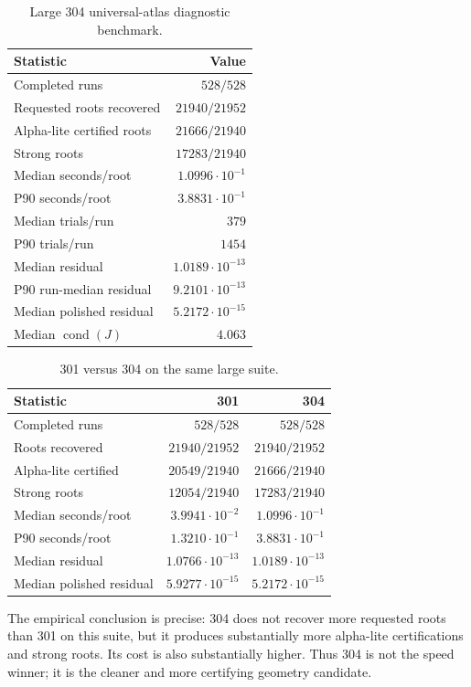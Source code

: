 \documentclass[11pt]{article}
\DeclareMathOperator{\cond}{cond}
\begin{document}
\begin{table}[h]
\centering
\caption{Large 304 universal-atlas diagnostic benchmark.}
\begin{tabular}{lr}
\toprule
Statistic & Value\\
\midrule
Completed runs & $528/528$\\
Requested roots recovered & $21940/21952$\\
Alpha-lite certified roots & $21666/21940$\\
Strong roots & $17283/21940$\\
Median seconds/root & $1.0996\cdot10^{-1}$\\
P90 seconds/root & $3.8831\cdot10^{-1}$\\
Median trials/run & $379$\\
P90 trials/run & $1454$\\
Median residual & $1.0189\cdot10^{-13}$\\
P90 run-median residual & $9.2101\cdot10^{-13}$\\
Median polished residual & $5.2172\cdot10^{-15}$\\
Median $\cond(J)$ & $4.063$\\
\bottomrule
\end{tabular}
\end{table}

\begin{table}[h]
\centering
\caption{301 versus 304 on the same large suite.}
\begin{tabular}{lrr}
\toprule
Statistic & 301 & 304\\
\midrule
Completed runs & $528/528$ & $528/528$\\
Roots recovered & $21940/21952$ & $21940/21952$\\
Alpha-lite certified & $20549/21940$ & $21666/21940$\\
Strong roots & $12054/21940$ & $17283/21940$\\
Median seconds/root & $3.9941\cdot10^{-2}$ & $1.0996\cdot10^{-1}$\\
P90 seconds/root & $1.3210\cdot10^{-1}$ & $3.8831\cdot10^{-1}$\\
Median residual & $1.0766\cdot10^{-13}$ & $1.0189\cdot10^{-13}$\\
Median polished residual & $5.9277\cdot10^{-15}$ & $5.2172\cdot10^{-15}$\\
\bottomrule
\end{tabular}
\end{table}

The empirical conclusion is precise: 304 does not recover more requested roots than 301 on this suite, but it produces substantially more alpha-lite certifications and strong roots.  Its cost is also substantially higher.  Thus 304 is not the speed winner; it is the cleaner and more certifying geometry candidate.
\end{document}

